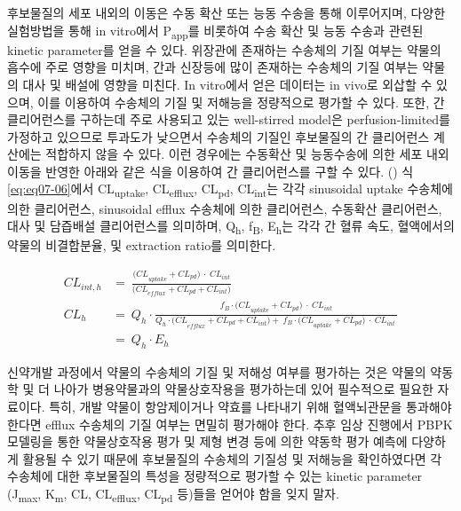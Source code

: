 \documentclass[
  11pt,
  krantz2, a4paper, twoside]{krantz}
\begin{document}
후보물질의 세포 내외의 이동은 수동 확산 또는 능동 수송을 통해
이루어지며, 다양한 실험방법을 통해 in vitro에서 P\textsubscript{app}를 비롯하여 수송
확산 및 능동 수송과 관련된 kinetic parameter를 얻을 수 있다. 위장관에
존재하는 수송체의 기질 여부는 약물의 흡수에 주로 영향을 미치며, 간과
신장등에 많이 존재하는 수송체의 기질 여부는 약물의 대사 및 배설에 영향을
미친다. In vitro에서 얻은 데이터는 in vivo로 외삽할 수 있으며, 이를
이용하여 수송체의 기질 및 저해능을 정량적으로 평가할 수 있다. 또한, 간
클리어런스를 구하는데 주로 사용되고 있는 well-stirred model은
perfusion-limited를 가정하고 있으므로 투과도가 낮으면서 수송체의 기질인
후보물질의 간 클리어런스 계산에는 적합하지 않을 수 있다. 이런 경우에는
수동확산 및 능동수송에 의한 세포 내외 이동을 반영한 아래와 같은 식을
이용하여 간 클리어런스를 구할 수 있다. () 식
\eqref{eq:eq07-06}에서 CL\textsubscript{uptake}, CL\textsubscript{efflux}, CL\textsubscript{pd}, CL\textsubscript{int}는 각각
sinusoidal uptake 수송체에 의한 클리어런스, sinusoidal efflux 수송체에
의한 클리어런스, 수동확산 클리어런스, 대사 및 담즙배설 클리어런스를
의미하며, Q\textsubscript{h}, f\textsubscript{B}, E\textsubscript{h}는 각각 간 혈류 속도, 혈액에서의 약물의
비결합분율, 및 extraction ratio를 의미한다.

\footnotesize

\begin{equation}
\begin{split}
{CL}_{int,h} &= \ \frac{{(CL}_{uptake} + {CL}_{pd})\  \cdot \ {CL}_{int}}{{(CL}_{efflux} + {CL}_{pd} + {CL}_{int})} \\
{CL}_{h} &= \ Q_{h} \cdot \frac{f_{B} \cdot {(CL}_{uptake} + {CL}_{pd})\  \cdot \ {CL}_{int}}{{Q_{h} \cdot (CL}_{efflux} + {CL}_{pd} + {CL}_{int}) + \ f_{B} \cdot {(CL}_{uptake} + {CL}_{pd})\  \cdot \ {CL}_{int}\ } \\ 
&= \ Q_{h} \cdot E_{h}
\end{split}
\label{eq:eq07-06} 
\end{equation}

\normalsize

신약개발 과정에서 약물의 수송체의 기질 및 저해성 여부를 평가하는 것은
약물의 약동학 및 더 나아가 병용약물과의 약물상호작용을 평가하는데 있어
필수적으로 필요한 자료이다. 특히, 개발 약물이 항암제이거나 약효를
나타내기 위해 혈액뇌관문을 통과해야 한다면 efflux 수송체의 기질 여부는
면밀히 평가해야 한다. 추후 임상 진행에서 PBPK 모델링을 통한 약물상호작용
평가 및 제형 변경 등에 의한 약동학 평가 예측에 다양하게 활용될 수 있기
때문에 후보물질의 수송체의 기질성 및 저해능을 확인하였다면 각 수송체에
대한 후보물질의 특성을 정량적으로 평가할 수 있는 kinetic parameter
(J\textsubscript{max}, K\textsubscript{m}, CL, CL\textsubscript{efflux}, CL\textsubscript{pd} 등)들을 얻어야 함을 잊지 말자.
\end{document}
